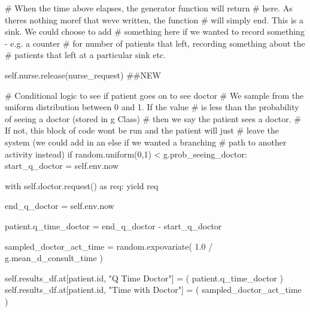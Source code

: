\documentclass[
  letterpaper,
  DIV=11,
  numbers=noendperiod]{scrreprt}
\newenvironment{Shaded}{}{}
\newcommand{\BuiltInTok}[1]{\textcolor[rgb]{0.84,0.23,0.29}{#1}}
\newcommand{\CommentTok}[1]{\textcolor[rgb]{0.42,0.45,0.49}{#1}}
\newcommand{\ControlFlowTok}[1]{\textcolor[rgb]{0.84,0.23,0.29}{#1}}
\newcommand{\DecValTok}[1]{\textcolor[rgb]{0.00,0.36,0.77}{#1}}
\newcommand{\FloatTok}[1]{\textcolor[rgb]{0.00,0.36,0.77}{#1}}
\newcommand{\ImportTok}[1]{\textcolor[rgb]{0.01,0.18,0.38}{#1}}
\newcommand{\NormalTok}[1]{\textcolor[rgb]{0.14,0.16,0.18}{#1}}
\newcommand{\OperatorTok}[1]{\textcolor[rgb]{0.14,0.16,0.18}{#1}}
\newcommand{\StringTok}[1]{\textcolor[rgb]{0.01,0.18,0.38}{#1}}
\newcommand{\VariableTok}[1]{\textcolor[rgb]{0.89,0.38,0.04}{#1}}
\begin{document}
\begin{tcolorbox}
\begin{Shaded}
\begin{Highlighting}[]
        \CommentTok{\# When the time above elapses, the generator function will return}
        \CommentTok{\# here.  As there\textquotesingle{}s nothing moref that we\textquotesingle{}ve written, the function}
        \CommentTok{\# will simply end.  This is a sink.  We could choose to add}
        \CommentTok{\# something here if we wanted to record something {-} e.g. a counter}
        \CommentTok{\# for number of patients that left, recording something about the}
        \CommentTok{\# patients that left at a particular sink etc.}

        \VariableTok{self}\NormalTok{.nurse.release(nurse\_request) }\CommentTok{\#\#NEW}

        \CommentTok{\# Conditional logic to see if patient goes on to see doctor}
        \CommentTok{\# We sample from the uniform distribution between 0 and 1.  If the value}
        \CommentTok{\# is less than the probability of seeing a doctor (stored in g Class)}
        \CommentTok{\# then we say the patient sees a doctor.}
        \CommentTok{\# If not, this block of code won\textquotesingle{}t be run and the patient will just}
        \CommentTok{\# leave the system (we could add in an else if we wanted a branching}
        \CommentTok{\# path to another activity instead)}
        \ControlFlowTok{if}\NormalTok{ random.uniform(}\DecValTok{0}\NormalTok{,}\DecValTok{1}\NormalTok{) }\OperatorTok{\textless{}}\NormalTok{ g.prob\_seeing\_doctor:}
\NormalTok{            start\_q\_doctor }\OperatorTok{=} \VariableTok{self}\NormalTok{.env.now}

            \ControlFlowTok{with} \VariableTok{self}\NormalTok{.doctor.request() }\ImportTok{as}\NormalTok{ req:}
                \ControlFlowTok{yield}\NormalTok{ req}

\NormalTok{                end\_q\_doctor }\OperatorTok{=} \VariableTok{self}\NormalTok{.env.now}

\NormalTok{                patient.q\_time\_doctor }\OperatorTok{=}\NormalTok{ end\_q\_doctor }\OperatorTok{{-}}\NormalTok{ start\_q\_doctor}

\NormalTok{                sampled\_doctor\_act\_time }\OperatorTok{=}\NormalTok{ random.expovariate(}
                    \FloatTok{1.0} \OperatorTok{/}\NormalTok{ g.mean\_d\_consult\_time}
\NormalTok{                )}

                \VariableTok{self}\NormalTok{.results\_df.at[patient.}\BuiltInTok{id}\NormalTok{, }\StringTok{"Q Time Doctor"}\NormalTok{] }\OperatorTok{=}\NormalTok{ (}
\NormalTok{                    patient.q\_time\_doctor}
\NormalTok{                )}
                \VariableTok{self}\NormalTok{.results\_df.at[patient.}\BuiltInTok{id}\NormalTok{, }\StringTok{"Time with Doctor"}\NormalTok{] }\OperatorTok{=}\NormalTok{ (}
\NormalTok{                    sampled\_doctor\_act\_time}
\NormalTok{                )}


\end{Highlighting}
\end{Shaded}
\end{tcolorbox}
\end{document}
